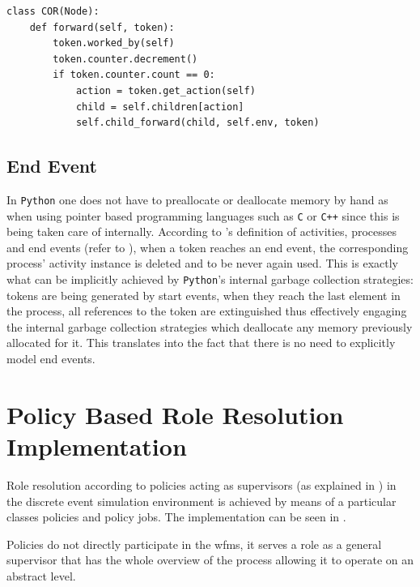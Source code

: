 \begin{lstlisting}[caption=Token's counter decrement logic at a convergent \glsentryshort{or} gateway,label=lst:or_counter_decrement,style=CustomPython]
class COR(Node):
    def forward(self, token):
        token.worked_by(self)
        token.counter.decrement()
        if token.counter.count == 0:
            action = token.get_action(self)
            child = self.children[action]
            self.child_forward(child, self.env, token)
\end{lstlisting}

\subsection{End Event}

In \texttt{Python} one does not have to preallocate or deallocate memory by hand as when using pointer based programming languages such as \texttt{C} or \texttt{C++} since this is being taken care of internally. According to \citet{Silver2011}'s definition of activities, processes and end events (refer to ), when a token reaches an end event, the corresponding process' activity instance is deleted and to be never again used. This is exactly what can be implicitly achieved by \texttt{Python}'s internal garbage collection strategies: tokens are being generated by start events, when they reach the last element in the process, all references to the token are extinguished thus effectively engaging the internal garbage collection strategies which deallocate any memory previously allocated for it. This translates into the fact that there is no need to explicitly model end events.

\section{Policy Based Role Resolution Implementation}
\label{sec:policy_implementation}
Role resolution according to policies acting as supervisors (as explained in ) in the discrete event simulation environment is achieved by means of a particular classes \ie policies and policy jobs. The implementation can be seen in .

Policies do not directly participate in the \gls{wfms}, it serves a role as a general supervisor that has the whole overview of the process allowing it to operate on an abstract level.



